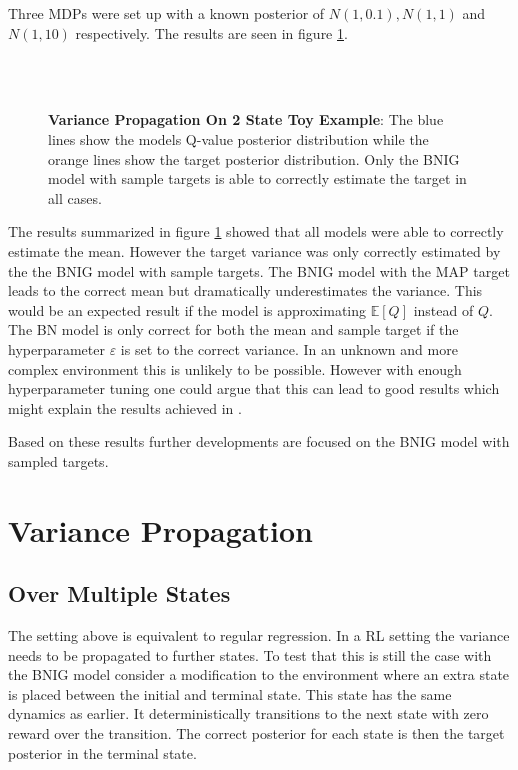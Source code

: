 Three MDPs were set up with a known posterior of $N(1, 0.1), N(1, 1)$ and $N(1, 10)$ respectively. The results are seen in figure \ref{fig:proptest}.

\begin{figure}[H]
    \centering
    \\
    \\
    \caption{\textbf{Variance Propagation On 2 State Toy Example}: The blue lines show the models Q-value posterior distribution while the orange lines show the target posterior distribution. Only the BNIG model with sample targets is able to correctly estimate the target in all cases.}
    \label{fig:proptest}
\end{figure}

The results summarized in figure \ref{fig:proptest} showed that all models were able to correctly estimate the mean. However the target variance was only correctly estimated by the the BNIG model with sample targets. The BNIG model with the MAP target leads to the correct mean but dramatically underestimates the variance. This would be an expected result if the model is approximating $\mathbb{E}[Q]$ instead of $Q$. The BN model is only correct for both the mean and sample target if the hyperparameter $\varepsilon$ is set to the correct variance. In an unknown and more complex environment this is unlikely to be possible. However with enough hyperparameter tuning one could argue that this can lead to good results which might explain the results achieved in \cite{azziz_2018}.

Based on these results further developments are focused on the BNIG model with sampled targets.

\section{Variance Propagation}

\subsection{Over Multiple States}

The setting above is equivalent to regular regression. In a RL setting the variance needs to be propagated to further states. To test that this is still the case with the BNIG model consider a modification to the environment where an extra state is placed between the initial and terminal state. This state has the same dynamics as earlier. It deterministically transitions to the next state with zero reward over the transition. The correct posterior for each state is then the target posterior in the terminal state. 

